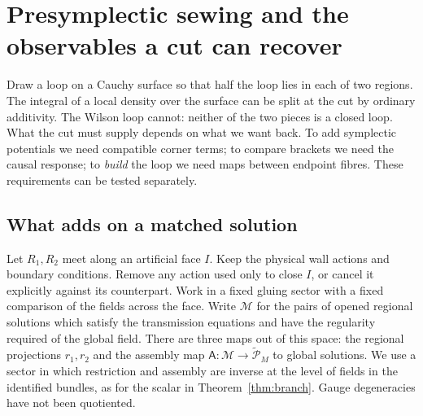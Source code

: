 \chapter{Presymplectic sewing and the observables a cut can recover}\label{ch:09}

Draw a loop on a Cauchy surface so that half the loop lies in each of two regions. The integral of a local density over the surface can be split at the cut by ordinary additivity. The Wilson loop cannot: neither of the two pieces is a closed loop. What the cut must supply depends on what we want back. To add symplectic potentials we need compatible corner terms; to compare brackets we need the causal response; to \emph{build} the loop we need maps between endpoint fibres. These requirements can be tested separately.

\section{What adds on a matched solution}

Let $R_1,R_2$ meet along an artificial face $I$. Keep the physical wall actions and boundary conditions. Remove any action used only to close $I$, or cancel it explicitly against its counterpart. Work in a fixed gluing sector with a fixed comparison of the fields across the face. Write $\mathcal M$ for the pairs of opened regional solutions which satisfy the transmission equations and have the regularity required of the global field. There are three maps out of this space: the regional projections $r_1,r_2$ and the assembly map $\mathsf A:\mathcal M\to\widetilde{\mathcal P}_M$ to global solutions. We use a sector in which restriction and assembly are inverse at the level of fields in the identified bundles, as for the scalar in Theorem~\ref{thm:branch}. Gauge degeneracies have not been quotiented.

